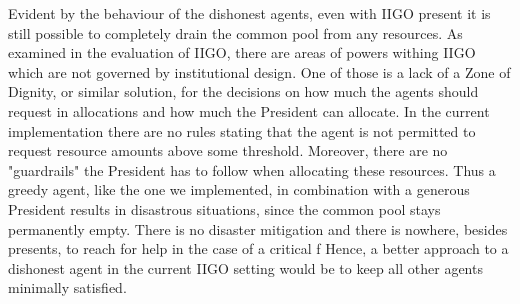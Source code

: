 Evident by the behaviour of the dishonest agents, even with IIGO present it is still possible to completely drain the common pool from any resources. As examined in the evaluation of IIGO, there are areas of powers withing IIGO which are not governed by institutional design. One of those is a lack of a Zone of Dignity, or similar solution, for the decisions on how much the agents should request in allocations and how much the President can allocate. In the current implementation there are no rules stating that the agent is not permitted to request resource amounts above some threshold. Moreover, there are no "guardrails" the President has to follow when allocating these resources. Thus a greedy agent, like the one we implemented, in combination with a generous President results in disastrous situations, since the common pool stays permanently empty. There is no disaster mitigation and there is nowhere, besides presents, to reach for help in the case of a critical f Hence, a better approach to a dishonest agent in the current IIGO setting would be to keep all other agents minimally satisfied.
